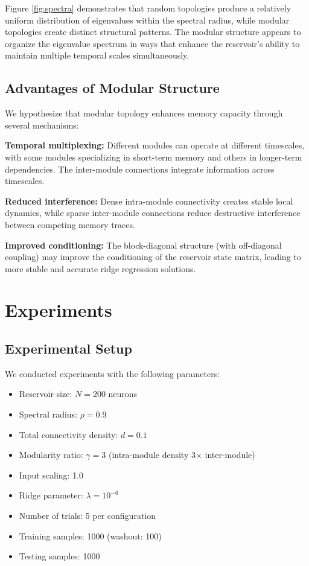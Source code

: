 \documentclass{article}
\begin{document}
Figure \ref{fig:spectra} demonstrates that random topologies produce a relatively uniform distribution of eigenvalues within the spectral radius, while modular topologies create distinct structural patterns. The modular structure appears to organize the eigenvalue spectrum in ways that enhance the reservoir's ability to maintain multiple temporal scales simultaneously.

\subsection{Advantages of Modular Structure}

We hypothesize that modular topology enhances memory capacity through several mechanisms:

\textbf{Temporal multiplexing:} Different modules can operate at different timescales, with some modules specializing in short-term memory and others in longer-term dependencies. The inter-module connections integrate information across timescales.

\textbf{Reduced interference:} Dense intra-module connectivity creates stable local dynamics, while sparse inter-module connections reduce destructive interference between competing memory traces.

\textbf{Improved conditioning:} The block-diagonal structure (with off-diagonal coupling) may improve the conditioning of the reservoir state matrix, leading to more stable and accurate ridge regression solutions.

\section{Experiments}

\subsection{Experimental Setup}

We conducted experiments with the following parameters:
\begin{itemize}
\item Reservoir size: $N = 200$ neurons
\item Spectral radius: $\rho = 0.9$
\item Total connectivity density: $d = 0.1$
\item Modularity ratio: $\gamma = 3$ (intra-module density 3× inter-module)
\item Input scaling: 1.0
\item Ridge parameter: $\lambda = 10^{-6}$
\item Number of trials: 5 per configuration
\item Training samples: 1000 (washout: 100)
\item Testing samples: 1000
\end{itemize}
\end{document}
